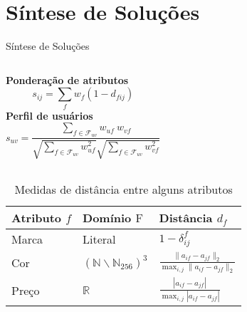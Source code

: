 \section[Síntese de Soluções]{Síntese de Soluções}
\begin{frame}{Síntese de Soluções}
\begin{columns}[c]
\textbf{Ponderação de atributos}
$$
    s_{ij} = \sum_{f}{w_{f} \left(1-d_{fij}\right)}
$$
\vspace{0.35cm}
\textbf{Perfil de usuários}
$$
    s_{uv} = \frac{\sum\limits_{f \in \mathcal{F}_{uv}}{w_{uf}~w_{vf}}}{\sqrt{\sum\limits_{f \in \mathcal{F}_{uv}
    }w_{uf}^2} \sqrt{\sum\limits_{f \in \mathcal{F}_{uv}}w_{vf}^2}} 
$$
\end{columns}


\begin{table}[hp]
\begin{center}
    \caption{Medidas de distância entre alguns atributos}
    \label{tab:medidas-distancia}
    \begin{tabular}{  | p{3cm} | p{3cm} | p{3cm} | } 
    \hline
    \textbf{Atributo} $f$ & \textbf{Domínio} $\mathrm{F}$ & \textbf{Distância} $d_f$ \\ \hline
    Marca & Literal & $1-\delta^f_{ij}$ \\ \hline    
    Cor & $\left(\mathbb{N}\backslash \mathbb{N}_{256}\right)^3$  & $ \frac{\lVert a_{if}-a_{jf} \rVert_2}{\max_{i,j}{\lVert a_{if}-a_{jf} \rVert_2}} $ \\ \hline
    Preço & $\mathbb{R}$ & $ \frac{\left| a_{if}-a_{jf} \right|}{\max_{i,j}{\left| a_{if}-a_{jf} \right|}} $ \\ \hline
    \end{tabular}
\end{center}
\end{table}
\end{frame}




